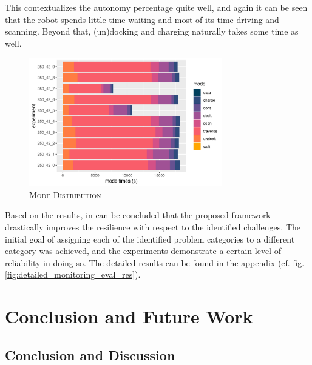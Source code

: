 \documentclass[english, master, utf8]{base/thesis_KBS}
\begin{document}
This contextualizes the autonomy percentage quite well, and again it can be seen that the robot spends little time waiting and most of its time driving and scanning.
Beyond that, (un)docking and charging naturally takes some time as well.
\begin{figure}[H]
    \centering
    \includegraphics[width=0.75\textwidth]{pics/mode_times.png}
    \caption{\textsc{Mode Distribution}}
    \label{fig:mode_times}
\end{figure}
Based on the results, in can be concluded that the proposed framework drastically improves the resilience with respect to the identified challenges. The initial goal of assigning each
of the identified problem categories to a different category was achieved, and the experiments demonstrate a certain level of reliability in doing so. The detailed results can be
found in the appendix (cf. fig. \ref{fig:detailed_monitoring_eval_res}).

\vfill
\pagebreak

\chapter{Conclusion and Future Work}

\section{Conclusion and Discussion}
\end{document}
